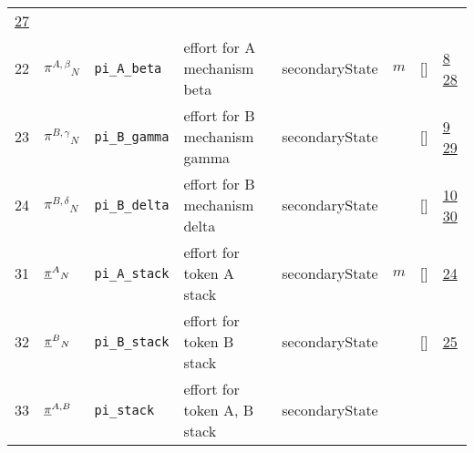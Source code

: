 \begin{longtable}{|p{1cm}|p{3cm}|p{3cm}|p{7cm}|p{3.0cm}|p{3cm}|p{2cm}|p{1cm}|}
                 \hyperlink{"e:27"}{ 27 }
                 \\
    22
             & \hypertarget{"v:22"}{ $ {{\pi^{A,\beta}}}{_{N}} $}
             & \verb|pi_A_beta|
             & effort for A mechanism beta
             & \begin{lay}secondaryState \end{lay}
             & $ m  $
             & []
             & \hyperlink{"e:8"}{ 8 }
                 \hyperlink{"e:28"}{ 28 }
                 \\
    23
             & \hypertarget{"v:23"}{ $ {{\pi^{B,\gamma}}}{_{N}} $}
             & \verb|pi_B_gamma|
             & effort for B mechanism gamma
             & \begin{lay}secondaryState \end{lay}
             & $  $
             & []
             & \hyperlink{"e:9"}{ 9 }
                 \hyperlink{"e:29"}{ 29 }
                 \\
    24
             & \hypertarget{"v:24"}{ $ {{\pi^{B,\delta}}}{_{N}} $}
             & \verb|pi_B_delta|
             & effort for B mechanism delta
             & \begin{lay}secondaryState \end{lay}
             & $  $
             & []
             & \hyperlink{"e:10"}{ 10 }
                 \hyperlink{"e:30"}{ 30 }
                 \\
    31
             & \hypertarget{"v:31"}{ $ {{{{\protect\underline{\bf{\pi}}}}^A}}{_{N}} $}
             & \verb|pi_A_stack|
             & effort for token A stack
             & \begin{lay}secondaryState \end{lay}
             & $ m  $
             & []
             & \hyperlink{"e:24"}{ 24 }
                 \\
    32
             & \hypertarget{"v:32"}{ $ {{{{\protect\underline{\bf{\pi}}}}^B}}{_{N}} $}
             & \verb|pi_B_stack|
             & effort for token B stack
             & \begin{lay}secondaryState \end{lay}
             & $  $
             & []
             & \hyperlink{"e:25"}{ 25 }
                 \\
    33
             & \hypertarget{"v:33"}{ $ {{{{\protect\underline{\bf{\pi}}}}^{A,B}}}{_{}} $}
             & \verb|pi_stack|
             & effort for token A, B stack
             & \begin{lay}secondaryState \end{lay}
             & $  $

\end{longtable}
